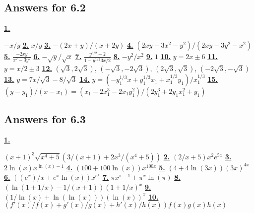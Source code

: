 \subsection *{Answers for 6.2}
\hypertarget {a:6.2.1}{\hyperlink {e:6.2.1}{\bfseries 1.}} \mdseries $-x/y$\qquad 
\hypertarget {a:6.2.2}{\hyperlink {e:6.2.2}{\bfseries 2.}} \mdseries $x/y$\qquad 
\hypertarget {a:6.2.3}{\hyperlink {e:6.2.3}{\bfseries 3.}} \mdseries $-(2x+y)/(x+2y)$\qquad 
\hypertarget {a:6.2.4}{\hyperlink {e:6.2.4}{\bfseries 4.}} \mdseries $(2xy-3x^2-y^2)/(2xy-3y^2-x^2)$\qquad 
\hypertarget {a:6.2.5}{\hyperlink {e:6.2.5}{\bfseries 5.}} \mdseries $\frac {-2xy}{x^2-3y^2}$\qquad 
\hypertarget {a:6.2.6}{\hyperlink {e:6.2.6}{\bfseries 6.}} \mdseries $-\sqrt {y}/\sqrt {x}$\qquad 
\hypertarget {a:6.2.7}{\hyperlink {e:6.2.7}{\bfseries 7.}} \mdseries $\frac {y^{3/2}-2}{1-y^{1/2}3x/2}$\qquad 
\hypertarget {a:6.2.8}{\hyperlink {e:6.2.8}{\bfseries 8.}} \mdseries $-y^2/x^2$\qquad 
\hypertarget {a:6.2.9}{\hyperlink {e:6.2.9}{\bfseries 9.}} \mdseries $1$\qquad 
\hypertarget {a:6.2.10}{\hyperlink {e:6.2.10}{\bfseries 10.}} \mdseries $y=2x\pm 6$\qquad 
\hypertarget {a:6.2.11}{\hyperlink {e:6.2.11}{\bfseries 11.}} \mdseries $y=x/2\pm 3$\qquad 
\hypertarget {a:6.2.12}{\hyperlink {e:6.2.12}{\bfseries 12.}} \mdseries $(\sqrt 3,2\sqrt 3)$, $(-\sqrt 3,-2\sqrt 3)$, $(2\sqrt 3,\sqrt 3)$, $(-2\sqrt 3,-\sqrt 3)$\qquad 
\hypertarget {a:6.2.13}{\hyperlink {e:6.2.13}{\bfseries 13.}} \mdseries $y=7x/\sqrt 3-8/\sqrt 3$\qquad 
\hypertarget {a:6.2.14}{\hyperlink {e:6.2.14}{\bfseries 14.}} \mdseries $y=(-y_1^{1/3}x+y_1^{1/3}x_1+x_1^{1/3}y_1)/x_1^{1/3}$\qquad 
\hypertarget {a:6.2.15}{\hyperlink {e:6.2.15}{\bfseries 15.}} \mdseries $(y-y_1)/(x-x_1)=(x_1-2x_1^3-2x_1y_1^2)/(2y_1^3+2y_1x_1^2+y_1)$\qquad 
\subsection *{Answers for 6.3}
\hypertarget {a:6.3.1}{\hyperlink {e:6.3.1}{\bfseries 1.}} \mdseries $(x+1)^3\sqrt {x^4+5}(3/(x+1) + 2x^3/(x^4+5))$\qquad 
\hypertarget {a:6.3.2}{\hyperlink {e:6.3.2}{\bfseries 2.}} \mdseries $(2/x + 5)x^2e^{5x}$\qquad 
\hypertarget {a:6.3.3}{\hyperlink {e:6.3.3}{\bfseries 3.}} \mdseries $2\ln (x)x^{\ln (x)-1}$\qquad 
\hypertarget {a:6.3.4}{\hyperlink {e:6.3.4}{\bfseries 4.}} \mdseries $(100 + 100 \ln (x))x^{100x}$\qquad 
\hypertarget {a:6.3.5}{\hyperlink {e:6.3.5}{\bfseries 5.}} \mdseries $(4+ 4\ln (3x)) (3x)^{4x}$\qquad 
\hypertarget {a:6.3.6}{\hyperlink {e:6.3.6}{\bfseries 6.}} \mdseries $((e^x)/x+ e^x\ln (x))x^{e^x}$\qquad 
\hypertarget {a:6.3.7}{\hyperlink {e:6.3.7}{\bfseries 7.}} \mdseries $\pi x^{\pi -1} + \pi ^x\ln (\pi )$\qquad 
\hypertarget {a:6.3.8}{\hyperlink {e:6.3.8}{\bfseries 8.}} \mdseries $(\ln (1+1/x) - 1/(x+1))(1+1/x)^x$\qquad 
\hypertarget {a:6.3.9}{\hyperlink {e:6.3.9}{\bfseries 9.}} \mdseries $(1/\ln (x)+\ln (\ln (x)))(\ln (x))^x$\qquad 
\hypertarget {a:6.3.10}{\hyperlink {e:6.3.10}{\bfseries 10.}} \mdseries $(f'(x)/f(x) + g'(x)/g(x) + h'(x)/h(x))f(x) g(x) h(x)$\qquad 
